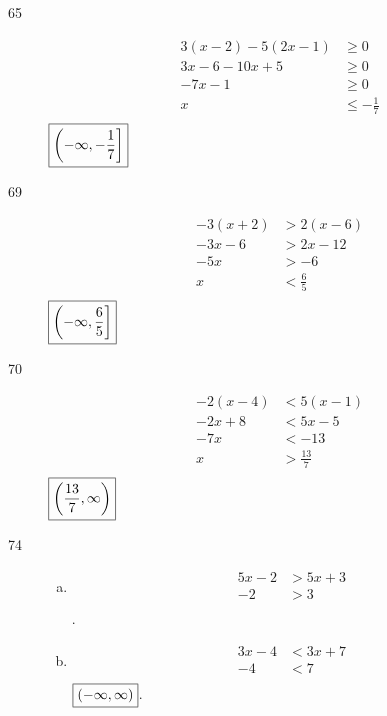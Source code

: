 \documentclass[letterpaper, landscape]{exam}
\begin{document}
\begin{description}
      \item[65]
        \begin{align*}
          3(x - 2) - 5(2x - 1) & \geq 0 \\
          3x - 6 - 10x + 5     & \geq 0 \\
          -7x - 1              & \geq 0 \\
          x                    & \leq - \frac{1}{7} \\
        \end{align*}
        $\boxed{ \intoc{ -\infty, - \frac{1}{7} } }$

      \item[69]
        \begin{align*}
          -3(x + 2) & > 2(x - 6) \\
          -3x - 6   & > 2x - 12 \\
          -5x       & > -6 \\
          x         & < \frac{6}{5} \\
        \end{align*}
        $\boxed{ \intoc{ -\infty, \frac{6}{5} } }$

      \item[70]
        \begin{align*}
          -2(x - 4) & < 5(x - 1) \\
          -2x + 8   & < 5x - 5 \\
          -7x       & < -13 \\
          x         & > \frac{13}{7} \\
        \end{align*}
        $\boxed{ \intoo{ \frac{13}{7}, \infty } }$

      \item[74]
        \begin{enumerate}[(a)]
          \item
            \begin{align*}
              5x - 2 & > 5x + 3 \\
              -2     & > 3 \\
            \end{align*}
            .

          \item
            \begin{align*}
              3x - 4 & < 3x + 7 \\
              -4     & < 7 \\
            \end{align*}
            $\boxed{ \intoo{ -\infty, \infty } }$.


\end{enumerate}
\end{description}
\end{document}
